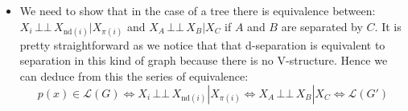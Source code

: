 \documentclass[10pt]{article}
\newcommand{\indep}{\ensuremath{\,\bot\!\!\!\bot\,}} %
\begin{document}
\begin{itemize}
\item We need to show that in the case of a tree there is equivalence between: $X_i \indep X_{\text{nd}(i)} | X_{\pi(i)}$ and $X_A \indep X_B | X_C$ if $A$ and $B$ are separated by $C$. It is pretty straightforward as we notice that that d-separation is equivalent to separation in this kind of graph because there is no V-structure. Hence we can deduce from this the series of equivalence:
\begin{equation}
p(x)\in\mathcal{L}(G) \Leftrightarrow X_i \indep X_{\text{nd}(i)} | X_{\pi(i)} \Leftrightarrow X_A \indep X_B | X_C \Leftrightarrow \mathcal{L}(G')
\end{equation}



\end{itemize}
\end{document}
